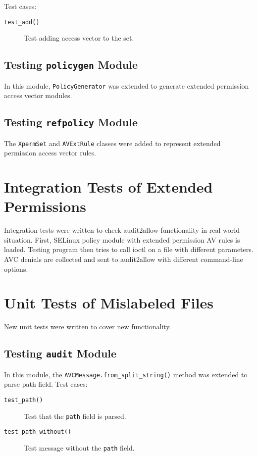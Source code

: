Test cases:
\begin{description}
    \item [\texttt{test\_add()}] Test adding access vector to the set.
\end{description}

\subsection{Testing \texttt{policygen} Module}

In this module, \texttt{PolicyGenerator} was extended to generate extended
permission access vector modules.

\subsection{Testing \texttt{refpolicy} Module}

The \texttt{XpermSet} and \texttt{AVExtRule} classes were added to represent
extended permission access vector rules.

\section{Integration Tests of Extended Permissions}

Integration tests were written to check audit2allow functionality in real world
situation. First, SELinux policy module with extended permission AV rules is
loaded. Testing program then tries to call ioctl on a file with different
parameters. AVC denials are collected and sent to audit2allow with different
command-line options.

\section{Unit Tests of Mislabeled Files}

New unit tests were written to cover new functionality.

\subsection{Testing \texttt{audit} Module}
In this module, the \texttt{AVCMessage.from\_split\_string()} method was
extended to parse path field. Test cases:
\begin{description}
    \item [\texttt{test\_path()}] Test that the \texttt{path} field is parsed.
    \item [\texttt{test\_path\_without()}] Test message without the \texttt{path}
        field.
\end{description}

